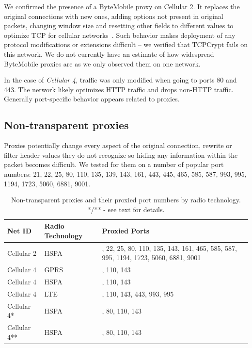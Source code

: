 \documentclass{sig-alternate-10pt}
\begin{document}
We confirmed the presence of a ByteMobile proxy on Cellular 2. It replaces the original connections with new ones, adding options not present in original packets, changing window size and resetting other fields to different values to optimize TCP for cellular networks~\cite{Ha:2006td}. Such behavior makes deployment of any protocol modifications or extensions difficult -- we verified that TCPCrypt fails on this network. We do not currently have an estimate of how widespread ByteMobile proxies are as we only observed them on one network.

In the case of \emph{Cellular 4}, traffic was only modified when going to ports 80 and 443. The network likely optimizes HTTP traffic and drops non-HTTP traffic. Generally port-specific behavior appears related to proxies.

\subsection{Non-transparent proxies}
\label{sec:proxies}

Proxies potentially change every aspect of the original connection, rewrite or filter header values they do not recognize so hiding any information within the packet becomes difficult. We tested for them on a number of popular port numbers:
21, 22, 25, 80, 110, 135, 139, 143, 161, 443, 445, 465, 585, 587, 993, 995, 1194, 1723, 5060, 6881, 9001.

\begin{table}[t!]
{\small
\begin{center}
\begin{tabular}{| l | >{\centering\arraybackslash}m{1.8cm} | >{\centering\arraybackslash}m{3.7cm} |}
\hline
    \textbf{Net ID} & \textbf{Radio Technology} & \textbf{Proxied Ports} \\ \hline \hline
    Cellular 2      & HSPA                      & 21, 22, 25, 80, 110, 135, 143, 161, 465, 585, 587, 995, 1194, 1723, 5060, 6881, 9001 \\ \hline
    Cellular 4      & GPRS                      & 80, 110, 143 \\ \hline
    Cellular 4      & HSPA                      & 80, 110, 143 \\ \hline
    Cellular 4      & LTE                       & 80, 110, 143, 443, 993, 995 \\ \hline
    Cellular 4*     & HSPA                     & 25, 80, 110, 143 \\ \hline
    Cellular 4**    & HSPA                    & 25, 80, 110, 143 \\ \hline
\end{tabular}
\end{center}
}
\caption{Non-transparent proxies and their proxied port numbers by radio technology. */** - see text for details.}
\label{tab:proxies}
\end{table}
\end{document}
